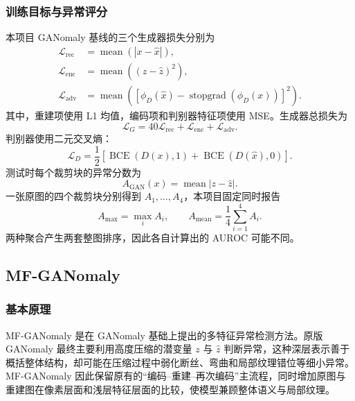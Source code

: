 \documentclass[UTF8,12pt]{ctexart}
\begin{document}
\subsubsection{训练目标与异常评分}

本项目 GANomaly 基线的三个生成器损失分别为
\begin{align}
\mathcal{L}_{\mathrm{rec}}&=\operatorname{mean}\left(|x-\hat{x}|\right),\\
\mathcal{L}_{\mathrm{enc}}&=\operatorname{mean}\left((z-\hat{z})^2\right),\\
\mathcal{L}_{\mathrm{adv}}&=\operatorname{mean}\left(
\left[\phi_D(\hat{x})-\operatorname{stopgrad}(\phi_D(x))\right]^2\right).
\end{align}
其中，重建项使用 L1 均值，编码项和判别器特征项使用 MSE。生成器总损失为
\begin{equation}
\mathcal{L}_{G}=40\mathcal{L}_{\mathrm{rec}}
+\mathcal{L}_{\mathrm{enc}}+\mathcal{L}_{\mathrm{adv}}.
\end{equation}
判别器使用二元交叉熵：
\begin{equation}
\mathcal{L}_{D}=\frac{1}{2}\left[
\operatorname{BCE}(D(x),1)+\operatorname{BCE}(D(\hat{x}),0)
\right].
\end{equation}
测试时每个裁剪块的异常分数为
\begin{equation}
A_{\mathrm{GAN}}(x)=\operatorname{mean}|z-\hat{z}|.
\end{equation}
一张原图的四个裁剪块分别得到 $A_1,\ldots,A_4$，本项目固定同时报告
\begin{equation}
A_{\max}=\max_i A_i,
\qquad
A_{\mathrm{mean}}=\frac{1}{4}\sum_{i=1}^{4}A_i.
\end{equation}
两种聚合产生两套整图排序，因此各自计算出的 AUROC 可能不同。

\subsection{MF-GANomaly}

\subsubsection{基本原理}

MF-GANomaly 是在 GANomaly 基础上提出的多特征异常检测方法。原版 GANomaly 最终主要利用高度压缩的潜变量 $z$ 与 $\hat z$ 判断异常，这种深层表示善于概括整体结构，却可能在压缩过程中弱化断丝、弯曲和局部纹理错位等细小异常。MF-GANomaly 因此保留原有的“编码--重建--再次编码”主流程，同时增加原图与重建图在像素层面和浅层特征层面的比较，使模型兼顾整体语义与局部纹理。
\end{document}
